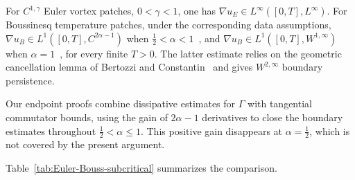 \documentclass[reqno,11pt,a4paper]{amsart}
\begin{document}
For $C^{1,\gamma}$ Euler vortex patches, $0<\gamma<1$,
one has $\nabla u_E\in L^\infty([0,T],L^\infty)$.
For Boussinesq temperature patches, under the corresponding
data assumptions,
$\nabla u_B\in L^1([0,T],C^{2\alpha-1})$
when $\frac12<\alpha<1$~\cite{KX22,LXY25},
and $\nabla u_B\in L^1([0,T],W^{1,\infty})$
when $\alpha=1$~\cite{GGJ17,CMX22},
for every finite $T>0$.
The latter estimate relies on the geometric cancellation
lemma of Bertozzi and Constantin~\cite{BerC}
and gives $W^{2,\infty}$ boundary persistence.

Our endpoint proofs combine dissipative estimates
for $\Gamma$ with tangential commutator bounds,
using the gain of $2\alpha-1$ derivatives
to close the boundary estimates throughout
$\frac12<\alpha\leq1$.
This positive gain disappears at $\alpha=\frac12$,
which is not covered by the present argument.

Table~\ref{tab:Euler-Bouss-subcritical} summarizes
the comparison.
\end{document}
